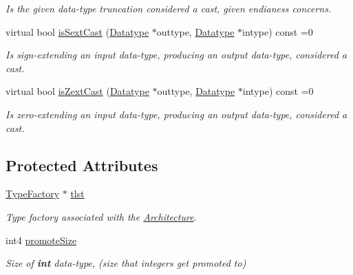 \begin{DoxyCompactItemize}
\begin{DoxyCompactList}\small\item\em Is the given data-\/type truncation considered a cast, given endianess concerns. \end{DoxyCompactList}\item 
virtual bool \mbox{\hyperlink{class_cast_strategy_a4c42bb2f8be16856a3c6ebbb1771aeaf}{is\+Sext\+Cast}} (\mbox{\hyperlink{class_datatype}{Datatype}} $\ast$outtype, \mbox{\hyperlink{class_datatype}{Datatype}} $\ast$intype) const =0
\begin{DoxyCompactList}\small\item\em Is sign-\/extending an input data-\/type, producing an output data-\/type, considered a cast. \end{DoxyCompactList}\item 
virtual bool \mbox{\hyperlink{class_cast_strategy_a472229904419d83774345e569cef92d2}{is\+Zext\+Cast}} (\mbox{\hyperlink{class_datatype}{Datatype}} $\ast$outtype, \mbox{\hyperlink{class_datatype}{Datatype}} $\ast$intype) const =0
\begin{DoxyCompactList}\small\item\em Is zero-\/extending an input data-\/type, producing an output data-\/type, considered a cast. \end{DoxyCompactList}\end{DoxyCompactItemize}
\subsection*{Protected Attributes}
\begin{DoxyCompactItemize}
\item 
\mbox{\hyperlink{class_type_factory}{Type\+Factory}} $\ast$ \mbox{\hyperlink{class_cast_strategy_a5a962dd129fd28373a43245976e3e09a}{tlst}}
\begin{DoxyCompactList}\small\item\em Type factory associated with the \mbox{\hyperlink{class_architecture}{Architecture}}. \end{DoxyCompactList}\item 
int4 \mbox{\hyperlink{class_cast_strategy_a0a8f84d834efacc20926b6712865e9e1}{promote\+Size}}
\begin{DoxyCompactList}\small\item\em Size of {\bfseries{int}} data-\/type, (size that integers get promoted to) \end{DoxyCompactList}\end{DoxyCompactItemize}


